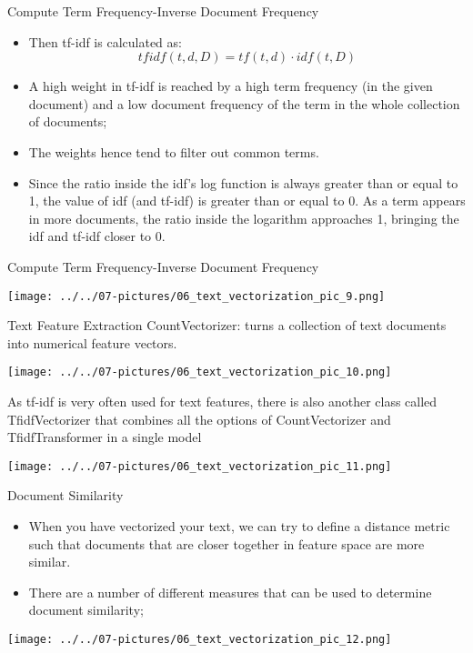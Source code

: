 \documentclass[11pt]{beamer}
\newcommand{\highlight}[1]{%
  \colorbox{yellow!100}{$\displaystyle#1$}}
\begin{document}
\begin{frame}{Compute Term Frequency-Inverse Document Frequency}
	\begin{itemize}
		\item Then tf-idf is calculated as: \begin{equation} tfidf(t,d,D) = tf(t,d) \cdot idf(t,D)\end{equation}
		\item A high weight in tf-idf is reached by a \highlight{\text{high term frequency}} (in the given document) and a \highlight{\text{low document frequency}} of the term in the whole collection of documents; 
\item The weights hence tend to filter out common terms. 
		\item Since the ratio inside the idf's log function is always greater than or equal to 1, the value of idf (and tf-idf) is greater than or equal to 0. As a term appears in more documents, the ratio inside the logarithm approaches 1, bringing the idf and tf-idf closer to 0.
	\end{itemize}
\end{frame}
\begin{frame}{Compute Term Frequency-Inverse Document Frequency}
	\begin{center}
	\texttt{[image: ../../07-pictures/06\_text\_vectorization\_pic\_9.png]}
	\end{center}
\end{frame}
\begin{frame}{Text Feature Extraction}
	CountVectorizer: turns a collection of text documents into numerical feature vectors.
	\begin{center}
	\texttt{[image: ../../07-pictures/06\_text\_vectorization\_pic\_10.png]}
	\end{center}
	As tf-idf is very often used for text features, there is also another class called TfidfVectorizer that combines all the options of CountVectorizer and TfidfTransformer in a single model
	\begin{center}
	\texttt{[image: ../../07-pictures/06\_text\_vectorization\_pic\_11.png]}
	\end{center}
\end{frame}
\begin{frame}{Document Similarity}
	\begin{itemize}
		\item When you have vectorized your text, we can try to define a distance metric such that documents that are closer together in feature space are more similar.
		\item There are a number of different measures that can be used to determine document similarity; 
	\end{itemize}
	\begin{center}
	\texttt{[image: ../../07-pictures/06\_text\_vectorization\_pic\_12.png]}
	\end{center}
\end{frame}
\end{document}
